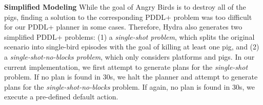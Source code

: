 \documentclass[letterpaper]{article} %
\begin{document}


\noindent\textbf{Simplified Modeling} While the goal of Angry Birds is to destroy all of the pigs, finding a solution to the corresponding PDDL+ problem was too difficult for our PDDL+ planner in some cases. 
Therefore, Hydra also generates two simplified PDDL+ problems:
(1) a \textit{single-shot problem}, which splits the original scenario into single-bird episodes with the goal of killing at least one pig, and (2) a \textit{single-shot-no-blocks problem}, which only considers platforms and pigs. In our current implementation, we first attempt to generate plans for the \textit{single-shot} problem. 
If no plan is found in 30s, we halt the planner and attempt to generate plans for the \textit{single-shot-no-blocks} problem. 
If again, no plan is found in 30s, we execute a pre-defined default action.
\end{document}
